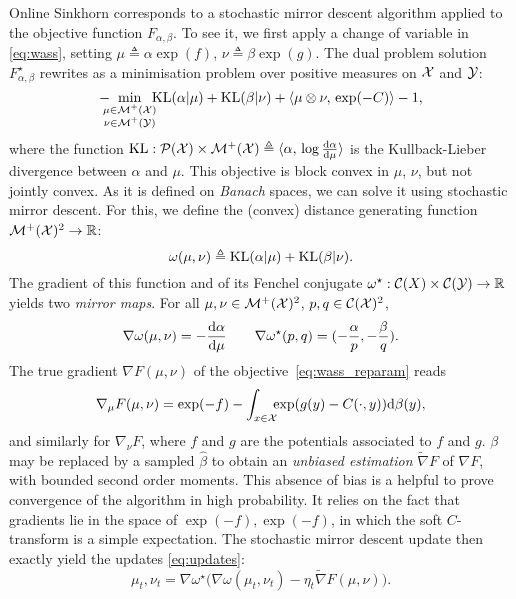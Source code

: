 Online Sinkhorn corresponds to a stochastic mirror descent algorithm applied to
the objective function $F_{\alpha, \beta}$. To see it, we first apply a change
of variable in \eqref{eq:wass}, setting $\mu \triangleq \alpha \exp(f)$, $\nu
\triangleq \beta \exp(g)$. The dual problem solution $F_{\alpha, \beta}^\star$
rewrites as a minimisation problem over positive measures on $\mathcal{X}$ and $\mathcal{Y}$:
\begin{equation}\label{eq:wass_reparam}
    - \!\!\!\!\min_{\substack{\mu \in \mathcal{M}^+(\mathcal{X}) \\ 
    \nu \in \mathcal{M}^+(\mathcal{Y})}} \!\!\!\textrm{KL}(\alpha | \mu)
    + \textrm{KL}(\beta | \nu) + \langle \mu \otimes \nu,\,\exp(-C)\rangle - 1,
\end{equation}
where the function $\textrm{KL}: \mathcal{P}(\mathcal{X}) \times \mathcal{M}^+(\mathcal{X}) \triangleq \langle \alpha,\,
    \log \frac{\textrm{d} \alpha}{\textrm{d} \mu}\rangle$ is the Kullback-Lieber divergence between
$\alpha$ and $\mu$. This objective is block convex in $\mu$, $\nu$, but not jointly convex. As it is defined on \textit{Banach} spaces, we can solve it using stochastic mirror descent. For this, we define the (convex) distance generating function $\mathcal{M}^+(\mathcal{X})^2 \to \mathbb{R}$:
\begin{equation}
    \omega(\mu, \nu) \triangleq \textrm{KL}(\alpha | \mu) + \textrm{KL}(\beta | \nu).
\end{equation}
The gradient of this function and of its Fenchel conjugate $\omega^\star: \mathcal{C}(X)
\times \mathcal{C}(\mathcal{Y}) \to \mathbb{R}$ yields two \textit{mirror maps}. For all $\mu, \nu \in
\mathcal{M}^+(\mathcal{X})^2$, $p, q \in \mathcal{C}(\mathcal{X})^2$,
\begin{equation}
    \nabla \omega(\mu, \nu) = - \frac{\textrm{d} \alpha}{\textrm{d} \mu}
    \qquad \nabla \omega^\star(p, q) = (-\frac{\alpha}{p}, -\frac{\beta}{q}).
\end{equation}
The true gradient $\nabla F(\mu, \nu)$ of the objective~\eqref{eq:wass_reparam} reads
\begin{equation}
    \nabla_\mu F(\mu, \nu) = \exp(-f) - 
    \int_{x \in \mathcal{X}} \!\!\! \exp(g(y) - C(\cdot, y))\textrm{d} \beta(y),
\end{equation}
and similarly for $\nabla_\nu F$, where $f$ and $g$ are the potentials associated
to $f$ and $g$. $\beta$ may be replaced by a sampled $\hat \beta$ to obtain an
\textit{unbiased estimation} $\tilde \nabla F$ of $\nabla F$, with bounded second order moments.
This absence of bias is a helpful to prove convergence of the algorithm in high
probability. It relies on the fact that gradients lie in the space of $\exp(-f),
\exp(-f)$, in which the soft $C$-transform is a simple expectation. The stochastic
mirror descent update then exactly yield the updates \eqref{eq:updates}:
% 
\begin{equation}
    \mu_t, \nu_t = \nabla \omega^\star\Big( \nabla \omega(\mu_t, \nu_t) - 
    \eta_t \tilde \nabla F(\mu, \nu)\Big).
\end{equation}

